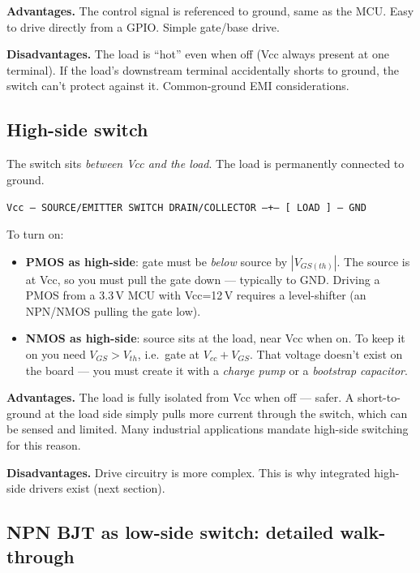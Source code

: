 \documentclass[11pt,a4paper]{article}
\begin{document}
\textbf{Advantages.} The control signal is referenced to ground, same as
the MCU. Easy to drive directly from a GPIO. Simple gate/base drive.

\textbf{Disadvantages.} The load is ``hot'' even when off (Vcc always
present at one terminal). If the load's downstream terminal accidentally
shorts to ground, the switch can't protect against it. Common-ground
EMI considerations.

\subsection{High-side switch}

The switch sits \emph{between Vcc and the load}. The load is permanently
connected to ground.

\begin{center}
\texttt{Vcc --- SOURCE/EMITTER \;\; SWITCH \;\; DRAIN/COLLECTOR ---+--- [ LOAD ] --- GND}
\end{center}

To turn on:
\begin{itemize}[leftmargin=*]
    \item \textbf{PMOS as high-side}: gate must be \emph{below} source by
    $|V_{GS(th)}|$. The source is at Vcc, so you must pull the gate down ---
    typically to GND. Driving a PMOS from a 3.3\,V MCU with Vcc=12\,V requires
    a level-shifter (an NPN/NMOS pulling the gate low).
    \item \textbf{NMOS as high-side}: source sits at the load, near Vcc when
    on. To keep it on you need $V_{GS} > V_{th}$, i.e.\ gate at $V_{cc} +
    V_{GS}$. That voltage doesn't exist on the board --- you must create it
    with a \emph{charge pump} or a \emph{bootstrap capacitor}.
\end{itemize}

\textbf{Advantages.} The load is fully isolated from Vcc when off ---
safer. A short-to-ground at the load side simply pulls more current
through the switch, which can be sensed and limited. Many industrial
applications mandate high-side switching for this reason.

\textbf{Disadvantages.} Drive circuitry is more complex. This is why
integrated high-side drivers exist (next section).

\subsection{NPN BJT as low-side switch: detailed walk-through}
\end{document}
